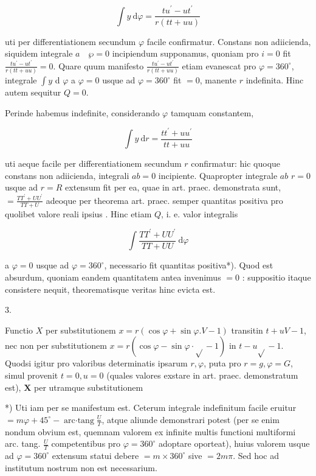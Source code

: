 \documentclass[10pt]{article}
\begin{document}
\[
\int y \mathrm{~d} \varphi=\frac{t u^{\prime}-u t^{\prime}}{r(t t+u u)}
\]

uti per differentiationem secundum \(\varphi\) facile confirmatur. Constans non adiicienda, siquidem integrale \(a \quad \wp=0\) incipiendum supponamus, quoniam pro \(i=0\) fit \(\frac{t u^{\prime}-u t^{\prime}}{r(t t+u u)}=0\). Quare quum manifesto \(\frac{t u^{\prime}-u t^{\prime}}{r(t t+u u)}\) etiam evanescat pro \(\varphi=360^{\circ}\), integrale \(\int y\) d \(\varphi\) a \(\varphi=0\) usque ad \(\varphi=360^{\circ}\) fit \(=0\), manente \(r\) indefinita. Hinc autem sequitur \(Q=0\).

Perinde habemus indefinite, considerando \(\varphi\) tamquam constantem,

\[
\int y \mathrm{~d} r=\frac{t t^{\prime}+u u^{\prime}}{t t+u u}
\]

uti aeque facile per differentiationem secundum \(r\) confirmatur: hic quoque constans non adiicienda, integrali \(a b=0\) incipiente. Quapropter integrale \(a b\) \(r=0\) usque ad \(r=R\) extensum fit per ea, quae in art. praec. demonstrata sunt, \(=\frac{T T^{\prime}+U U^{\prime}}{T T+U}\) adeoque per theorema art. praec. semper quantitas positiva pro quolibet valore reali ipsius \(\). Hinc etiam \(Q\), i. e. valor integralis

\[
\int \frac{T T^{\prime}+U U^{\prime}}{T T+U U} \mathrm{~d} \varphi
\]

a \(\varphi=0\) usque ad \(\varphi=360^{\circ}\), necessario fit quantitas positiva*). Quod est absurdum, quoniam eandem quantitatem antea invenimus \(=0\) : suppositio itaque consistere nequit, theorematisque veritas hinc evicta est.

3.

Functio \(X\) per substitutionem \(x=r(\cos \varphi+\sin \varphi . V-1)\) transitin \(t+u V-1\), nec non per substitutionem \(x=r(\cos \varphi-\sin \varphi \cdot \sqrt{ }-1)\) in \(t-u \sqrt{ }-1\). Quodsi igitur pro valoribus determinatis ipsarum \(r, \varphi\), puta pro \(r=g, \varphi=G\), simul provenit \(t=0, u=0\) (quales valores exstare in art. praec. demonstratum est), \(\boldsymbol{X}\) per utramque substitutionem

*) Uti iam per se manifestum est. Ceterum integrale indefinitum facile eruitur \(=m \varphi+45^{\circ}-\operatorname{arc\cdot tang} \frac{U}{T}\), atque aliunde demonstrari potest (per se enim nondum obvium est, quemnam valorem ex infinite multis functioni multiformi arc. tang. \(\frac{U}{T}\) competentibus pro \(\varphi=360^{\circ}\) adoptare oporteat), huius valorem usque ad \(\varphi=360^{\circ}\) extensum statui debere \(=m \times 360^{\circ}\) sive \(=2 m \pi\). Sed hoc ad institutum nostrum non est necessarium.
\end{document}
